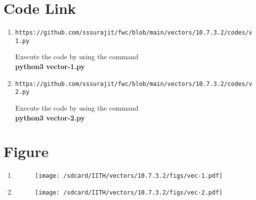 \documentclass[journal,12pt,twocolumn]{IEEEtran}
\begin{document}
\section{\textbf{Code Link}}
\begin{enumerate}[label=(\roman*)]
\item 
\begin{lstlisting}
https://github.com/sssurajit/fwc/blob/main/vectors/10.7.3.2/codes/vector-1.py
\end{lstlisting}
Execute the code by using the command\\
\textbf{python3 vector-1.py}\\
\item
\begin{lstlisting}
https://github.com/sssurajit/fwc/blob/main/vectors/10.7.3.2/codes/vector-2.py
\end{lstlisting}
Execute the code by using the command\\
\textbf{python3 vector-2.py}\\
\end{enumerate}
\section{\textbf{Figure}}
\begin{enumerate}[label=(\roman*)]
\item
\begin{figure}[!ht]
    \centering
\texttt{[image: /sdcard/IITH/vectors/10.7.3.2/figs/vec-1.pdf]}
\caption{}
\label{fig:vec}
\end{figure}
\item
\begin{figure}[!ht]
    \centering
\texttt{[image: /sdcard/IITH/vectors/10.7.3.2/figs/vec-2.pdf]}
\caption{}
\label{fig:vec}
\end{figure}
\end{enumerate}
\end{document}
